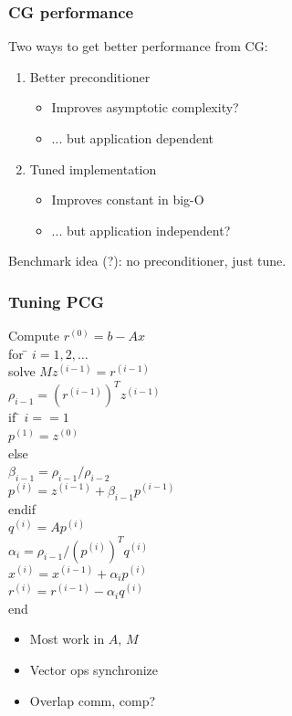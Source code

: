 \documentclass{beamer}
\begin{document}
\begin{frame}
  \frametitle{CG performance}
  
  Two ways to get better performance from CG:
  \begin{enumerate}
  \item Better preconditioner 
    \begin{itemize}
    \item Improves asymptotic complexity?
    \item ... but application dependent
    \end{itemize}
  \item Tuned implementation
    \begin{itemize}
    \item Improves constant in big-O
    \item ... but application independent?
    \end{itemize}
  \end{enumerate}
  Benchmark idea (?): no preconditioner, just tune.
  
\end{frame}


\begin{frame}[fragile]
  \frametitle{Tuning PCG}

\begin{minipage}{0.5\textwidth}
\begin{tabbing}
Compute $r^{(0)} = b - Ax$ \\
for \= $i = 1, 2, \ldots$ \\
\> solve $Mz^{(i-1)} = r^{(i-1)}$ \\
\> $\rho_{i-1} = (r^{(i-1)})^T z^{(i-1)}$ \\
\> if \= $i == 1$ \\
\> \> $p^{(1)} = z^{(0)}$ \\
\> else \\
\> \> $\beta_{i-1} = \rho_{i-1}/\rho_{i-2}$ \\
\> \> $p^{(i)} = z^{(i-1)} + \beta_{i-1} p^{(i-1)}$ \\
\> endif \\
\> $q^{(i)} = A p^{(i)}$ \\
\> $\alpha_i = \rho_{i-1} / (p^{(i)})^T q^{(i)}$ \\
\> $x^{(i)} = x^{(i-1)} + \alpha_i p^{(i)}$ \\
\> $r^{(i)} = r^{(i-1)} - \alpha_i q^{(i)}$ \\
end
\end{tabbing}
\end{minipage}
\begin{minipage}{0.45\textwidth}
  \begin{itemize}
  \item Most work in $A$, $M$
  \item Vector ops synchronize
  \item Overlap comm, comp?
  \end{itemize}
\end{minipage}

\end{frame}
\end{document}
